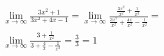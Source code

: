 \begin{ex}
\begin{align}
&\lim_{x\rightarrow \infty} \frac{3x^2+1}{3x^2+4x-1}=\lim_{x\rightarrow \infty} \frac{\frac{3x^2}{x^2}+\frac{1}{x^2}}{\frac{3x^2}{x^2}+\frac{4x}{x^2}-\frac{1}{x^2}}=\nonumber\\
&\lim_{x\rightarrow \infty} \frac{3+\frac{1}{x^2}}{3+\frac{4}{x}-\frac{1}{x^2}}=\frac{3}{3}=1\nonumber
\end{align}
\end{ex}